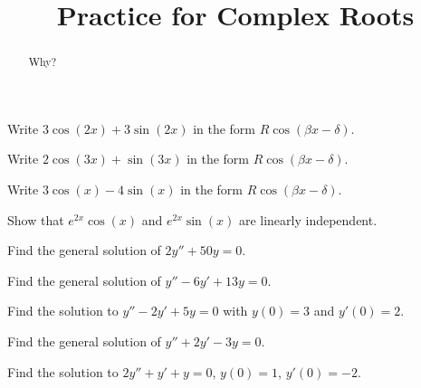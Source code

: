 \documentclass{ximera}
\title{Practice for Complex Roots}
\begin{document}
\begin{abstract}
    Why?
\end{abstract}
\maketitle



\begin{exercise}%
    Write $3 \cos(2x) + 3\sin(2x)$ in the form $R \cos(\beta x - \delta)$.
\end{exercise}

\begin{exercise}
    Write $2 \cos(3x) + \sin(3x)$ in the form $R \cos(\beta x - \delta)$.
\end{exercise}

\begin{exercise}
    Write $3 \cos(x) - 4\sin(x)$ in the form $R \cos(\beta x - \delta)$.
\end{exercise}

\begin{exercise}
    Show that $e^{2x}\cos(x)$ and $e^{2x}\sin(x)$ are linearly independent.
\end{exercise}

\begin{exercise}
    Find the general solution of $2y'' + 50y = 0$.
\end{exercise}

\begin{exercise}
    Find the general solution of $y'' - 6 y' + 13 y = 0$.
\end{exercise}

\begin{exercise}
    Find the solution to $y'' - 2y' + 5y = 0$ with $y(0) = 3$ and $y'(0) = 2$. 
\end{exercise} 

\begin{exercise}
    Find the general solution of $y'' + 2y' - 3y = 0$.
\end{exercise}

\begin{exercise}%
    Find the solution to $2y''+y'+y=0$, $y(0) = 1$, $y'(0)=-2$.
\end{exercise}
\end{document}
